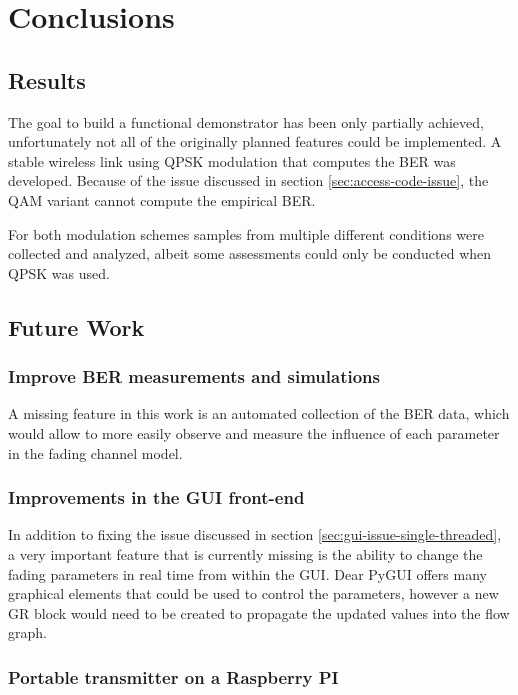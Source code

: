 
\chapter{Conclusions} \label{chp:conclusions}

\section{Results}

The goal to build a functional demonstrator has been only partially achieved, unfortunately not all of the originally planned features could be implemented. A stable wireless link using QPSK modulation that computes the BER was developed. Because of the issue discussed in section \ref{sec:access-code-issue}, the QAM variant cannot compute the empirical BER.

For both modulation schemes samples from multiple different conditions were collected and analyzed, albeit some assessments could only be conducted when QPSK was used.

\section{Future Work}

\subsection{Improve BER measurements and simulations}

A missing feature in this work is an automated collection of the BER data, which would allow to more easily observe and measure the influence of each parameter in the fading channel model.

\subsection{Improvements in the GUI front-end}

In addition to fixing the issue discussed in section \ref{sec:gui-issue-single-threaded}, a very important feature that is currently missing is the ability to change the fading parameters in real time from within the GUI. Dear PyGUI offers many graphical elements that could be used to control the parameters, however a new GR block would need to be created to propagate the updated values into the flow graph.

\subsection{Portable transmitter on a Raspberry PI}


